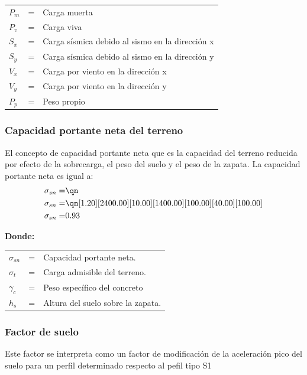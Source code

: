 \documentclass{article}%
\begin{document}
\begin{table}[h!]
    \centering
    \begin{tabular}{lll}
        $P_m$ &=&   Carga muerta\\
        $P_v$ &=&   Carga viva\\
        $S_x$ &=&   Carga sísmica debido al sismo en la dirección x\\
        $S_y$ &=&   Carga sísmica debido al sismo en la dirección y\\
        $V_x$ &=&   Carga por viento en la dirección x\\
        $V_y$ &=&   Carga por viento en la dirección y\\
        $P_p$ &=&   Peso propio\\
    \end{tabular}
\end{table}

%
\subsubsection{Capacidad portante neta del terreno}

    El concepto de capacidad portante neta que es la capacidad del terreno reducida por efecto de la sobrecarga, el peso del suelo y el peso de la zapata. La capacidad portante neta es igual a:
    \begin{align}
        \sigma_{sn} =&\qn \\
        \sigma_{sn} =&\qn[1.20][2400.00][10.00][1400.00][100.00][40.00][100.00]\\
        \sigma_{sn} =& 0.93
    \end{align}

    \textbf{Donde:}

    \begin{table}[h!]
        \centering
        \begin{tabular}{lll}
            $\sigma_{sn}$ &=&    Capacidad portante neta.\\
            $\sigma_t$ &=&   Carga admisible del terreno.\\
            $\gamma_c$ &=&    Peso específico del concreto\\
            $h_s$ &=&   Altura del suelo sobre la zapata.\\
        \end{tabular}
    \end{table}
\subsubsection{Factor de suelo}%
\label{ssubsec:Factordesuelo}%
Este factor se interpreta como  un factor de modificación de la aceleración pico del suelo para un perfil determinado respecto al pefil tipo S1%
\end{document}
